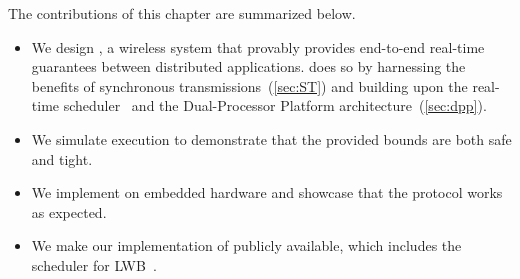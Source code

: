 The contributions of this chapter are summarized below.
\begin{itemize}
  \item
  We design \DRP, a wireless \CPS system that provably provides end-to-end real-time guarantees between distributed applications. \DRP does so by harnessing the benefits of synchronous transmissions~(\cref{sec:ST}) and building upon the \blink real-time scheduler~\cite{zimmerling2017Blink} and the Dual-Processor Platform architecture~(\cref{sec:dpp}).

  \item
  We simulate \DRP execution to demonstrate that the provided bounds are both safe and tight.

  \item
  We implement \DRP on embedded hardware and showcase that the protocol works as expected.

  \item
  We make our implementation of \DRP publicly available, which includes the \blink scheduler for LWB~\cite{ferrari2012LWB}.

\end{itemize}
